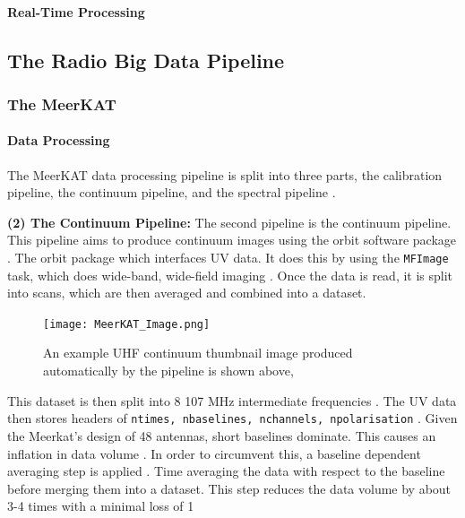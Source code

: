 \documentclass[preprint,linenumbers, longauthor]{aastex631}
\begin{document}
\paragraph{Real-Time Processing}

\subsection{The Radio Big Data Pipeline}

\subsubsection{The MeerKAT}

\paragraph{Data Processing}

The MeerKAT data processing pipeline is split into three parts, the calibration pipeline, the continuum pipeline, and the spectral pipeline \citep{ratcliffeSDPPipelinesOverview2021}.

 \textbf{(2) The Continuum Pipeline:} 
The second pipeline is the continuum pipeline. This pipeline aims to produce continuum images using the orbit software package \citep{ratcliffeSDPPipelinesOverview2021, cottonObitDevelopmentEnvironment2008}.
The orbit package which interfaces UV data. It does this by using the \texttt{MFImage} task, which does wide-band, wide-field imaging \citep{ratcliffeSDPPipelinesOverview2021,cottonAttemptAdaptSaultWieringa2010}.
Once the data is read, it is split into scans, which are then averaged and combined into a dataset. 

 \begin{figure}[h!]
  \centering
  \texttt{[image: MeerKAT\_Image.png]}
  \caption{An example UHF continuum thumbnail image produced automatically by the pipeline is shown above, \citep{ratcliffeSDPPipelinesOverview2021}}
  \label{fig:Meerkat_Image}
\end{figure}

This dataset is then split into 8 107 MHz intermediate frequencies \citep{ratcliffeSDPPipelinesOverview2021}.
The UV data then stores headers of \texttt{ntimes, nbaselines, nchannels, npolarisation} \citep{ratcliffeSDPPipelinesOverview2021}.
Given the Meerkat's design of 48 antennas, short baselines dominate. This causes an inflation in data volume \citep{ratcliffeSDPPipelinesOverview2021}. In order to circumvent this, a baseline dependent averaging step is applied \citep{ratcliffeSDPPipelinesOverview2021}.
Time averaging the data with respect to the baseline before merging them into a dataset. This step reduces the data volume by about 3-4 times with a minimal loss of 1%
\end{document}
